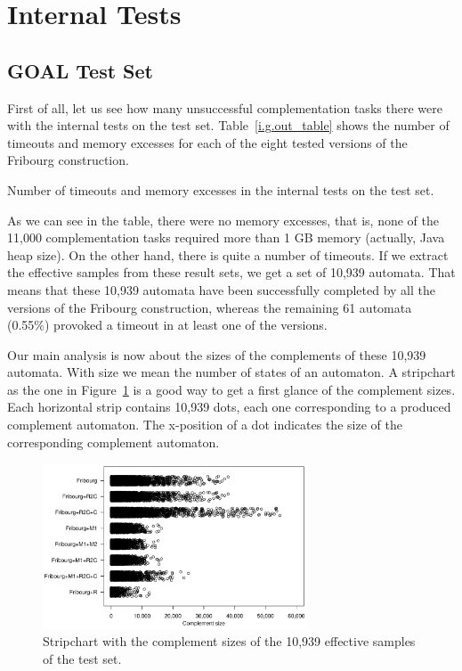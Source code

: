 \section{Internal Tests}

\subsection{GOAL Test Set}
\label{5_internal_goal}
First of all, let us see how many unsuccessful complementation tasks there were with the internal tests on the \goal{} test set. Table~\ref{i.g.out_table} shows the number of timeouts and memory excesses for each of the eight tested versions of the Fribourg construction.

\begin{table}[ht]
\centering

\caption{Number of timeouts and memory excesses in the internal tests on the \goal{} test set.}
\label{i.g.out_table}
\end{table}

As we can see in the table, there were no memory excesses, that is, none of the 11,000 complementation tasks required more than 1 GB memory (actually, Java heap size). On the other hand, there is quite a number of timeouts. If we extract the effective samples from these result sets, we get a set of 10,939 automata. That means that these 10,939 automata have been successfully completed by all the versions of the Fribourg construction, whereas the remaining 61 automata (0.55\%) provoked a timeout in at least one of the versions.

Our main analysis is now about the sizes of the complements of these 10,939 automata. With size we mean the number of states of an automaton. A stripchart as the one in Figure~\ref{i.g.stripchart} is a good way to get a first glance of the complement sizes. Each horizontal strip contains 10,939 dots, each one corresponding to a produced complement automaton. The x-position of a dot indicates the size of the corresponding complement automaton.

\begin{figure}[ht]
\centering
\includegraphics[width=0.7\textwidth]{figures/r/internal/goal/s.stripchart.pdf}
\caption{Stripchart with the complement sizes of the 10,939 effective samples of the \goal{} test set.}
\label{i.g.stripchart}
\end{figure}

